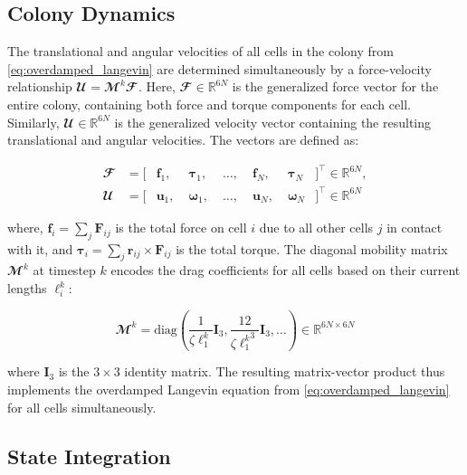 \documentclass[conference]{IEEEtran}
\begin{document}
\subsection{Colony Dynamics}

The translational and angular velocities of all cells in the colony from \autoref{eq:overdamped_langevin} are determined simultaneously by a force-velocity relationship $\mathbfcal{U} = \mathbfcal{M}^k \mathbfcal{F}$. Here, $\mathbfcal{F} \in \mathbb{R}^{6N}$ is the generalized force vector for the entire colony, containing both force and torque components for each cell. Similarly, $\mathbfcal{U} \in \mathbb{R}^{6N}$ is the generalized velocity vector containing the resulting translational and angular velocities. The vectors are defined as:

\begin{equation}
    \begin{alignedat}{5}
        \mathbfcal{F} &= [&\mathbf{f}_1,&\;\boldsymbol{\tau}_1,&\;\dots,&\;\mathbf{f}_N,&\;\boldsymbol{\tau}_N&]^\top \in \mathbb{R}^{6N}, \\
        \mathbfcal{U} &= [&\mathbf{u}_1,&\;\boldsymbol{\omega}_1,&\;\dots,&\;\mathbf{u}_N,&\;\boldsymbol{\omega}_N&]^\top \in \mathbb{R}^{6N}
    \end{alignedat}
\end{equation}

where, $\mathbf{f}_i = \sum_j \mathbf{F}_{ij}$ is the total force on cell $i$ due to all other cells $j$ in contact with it, and $\boldsymbol{\tau}_i = \sum_j \mathbf{r}_{ij} \times \mathbf{F}_{ij}$ is the total torque. The diagonal mobility matrix $\mathbfcal{M}^k$ at timestep $k$ encodes the drag coefficients for all cells based on their current lengths $\ell_i^k$:

\begin{equation}
    \mathbfcal{M}^k = \text{diag}\left(\frac{1}{\zeta \ell_1^k}\mathbf{I}_3, \frac{12}{\zeta {\ell_1^k}^3}\mathbf{I}_3, \dots \right) \in \mathbb{R}^{6N \times 6N}
\end{equation}

where $\mathbf{I}_3$ is the $3 \times 3$ identity matrix. The resulting matrix-vector product thus implements the overdamped Langevin equation from \autoref{eq:overdamped_langevin} for all cells simultaneously.

\subsection{State Integration}
\end{document}
